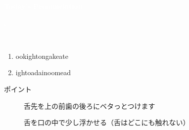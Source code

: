 \documentclass[aspectratio=169,xcolor={dvipsnames,table}]{beamer}
\begin{document}
\begin{frame}
\centering
  \textcolor{white}{\Huge\bfseries Today's Pronunciation}\pause

 \vspace{30pt}

  \textcolor{white}{\Huge\bfseries {}, }
\end{frame}
\begin{frame}[plain,label=slide_l_r]{\,\,\,}

\large

\begin{enumerate}
 \item  {}\hspace{20pt}ook\hspace{1\zw}ight\hspace{1\zw}ong\hspace{1\zw}ake\hspace{1\zw}ate
 \item  {}\hspace{20pt}ight\hspace{1\zw}oad\hspace{1\zw}ain\hspace{1\zw}oom\hspace{1\zw}ead
\end{enumerate}

\vspace*{20pt}

\normalsize
ポイント

\begin{description}
 \item[] 舌先を上の前歯の後ろにベタっとつけます
 \item[] 舌を口の中で少し浮かせる（舌はどこにも触れない）
\end{description}
\hfill{}
\end{frame}
\end{document}
